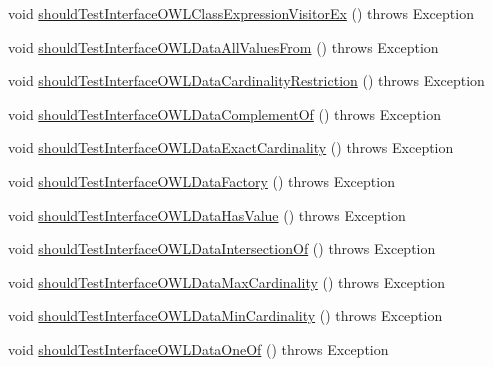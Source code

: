 \begin{DoxyCompactItemize}
\item 
void \hyperlink{classorg_1_1semanticweb_1_1owlapi_1_1contract_1_1_contract_owlapi_model__1_test_ae5f65f67da78e8c438d451d1362af4a1}{should\-Test\-Interface\-O\-W\-L\-Class\-Expression\-Visitor\-Ex} ()  throws Exception 
\item 
void \hyperlink{classorg_1_1semanticweb_1_1owlapi_1_1contract_1_1_contract_owlapi_model__1_test_a704b0a0c6bd1b915c7986cefcf5fb5d0}{should\-Test\-Interface\-O\-W\-L\-Data\-All\-Values\-From} ()  throws Exception 
\item 
void \hyperlink{classorg_1_1semanticweb_1_1owlapi_1_1contract_1_1_contract_owlapi_model__1_test_a83bf932dd30fcce7827236fabf14adaa}{should\-Test\-Interface\-O\-W\-L\-Data\-Cardinality\-Restriction} ()  throws Exception 
\item 
void \hyperlink{classorg_1_1semanticweb_1_1owlapi_1_1contract_1_1_contract_owlapi_model__1_test_ac5c5b6c15e6803dad3046b0603343a18}{should\-Test\-Interface\-O\-W\-L\-Data\-Complement\-Of} ()  throws Exception 
\item 
void \hyperlink{classorg_1_1semanticweb_1_1owlapi_1_1contract_1_1_contract_owlapi_model__1_test_a5d16e438eee45d564b0cac554c305cde}{should\-Test\-Interface\-O\-W\-L\-Data\-Exact\-Cardinality} ()  throws Exception 
\item 
void \hyperlink{classorg_1_1semanticweb_1_1owlapi_1_1contract_1_1_contract_owlapi_model__1_test_a4adb8aa9224248dd24ff6af6c89852f8}{should\-Test\-Interface\-O\-W\-L\-Data\-Factory} ()  throws Exception 
\item 
void \hyperlink{classorg_1_1semanticweb_1_1owlapi_1_1contract_1_1_contract_owlapi_model__1_test_a9a864aeb6ba006f7d39e695b0cf55e46}{should\-Test\-Interface\-O\-W\-L\-Data\-Has\-Value} ()  throws Exception 
\item 
void \hyperlink{classorg_1_1semanticweb_1_1owlapi_1_1contract_1_1_contract_owlapi_model__1_test_a9f02c96e1e62c88d9faf9450ceffb266}{should\-Test\-Interface\-O\-W\-L\-Data\-Intersection\-Of} ()  throws Exception 
\item 
void \hyperlink{classorg_1_1semanticweb_1_1owlapi_1_1contract_1_1_contract_owlapi_model__1_test_aeaadf4fd2bf7a2048a4f36ba0abee08e}{should\-Test\-Interface\-O\-W\-L\-Data\-Max\-Cardinality} ()  throws Exception 
\item 
void \hyperlink{classorg_1_1semanticweb_1_1owlapi_1_1contract_1_1_contract_owlapi_model__1_test_ad7e1190578cb172b31b8721771fd1bd9}{should\-Test\-Interface\-O\-W\-L\-Data\-Min\-Cardinality} ()  throws Exception 
\item 
void \hyperlink{classorg_1_1semanticweb_1_1owlapi_1_1contract_1_1_contract_owlapi_model__1_test_aee719b4a214bd87fb673d3f97a38cee9}{should\-Test\-Interface\-O\-W\-L\-Data\-One\-Of} ()  throws Exception 
\end{DoxyCompactItemize}


